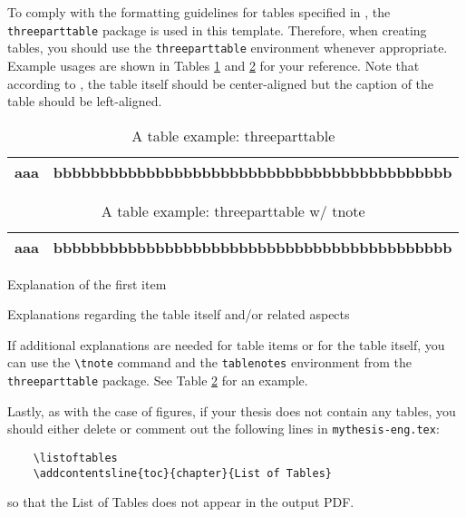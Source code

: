 To comply with the formatting guidelines for tables specified in \cite{ThesisGuide}, the \verb|threeparttable| package is used in this template.
Therefore, when creating tables, you should use the \verb|threeparttable| environment whenever appropriate.
Example usages are shown in Tables \ref{tab:Threeparttable} and \ref{tab:ThreeparttableWithTnote} for your reference.
Note that according to \cite{ThesisGuide}, the table itself should be center-aligned but the caption of the table should be left-aligned.

\begin{table}[ht]
	\centering%
	\begin{threeparttable}
		\caption{A table example: threeparttable}
		\begin{tabular}{>{\centering}m{1.5cm}|c}
			\hline\hline
			aaa 	& bbbbbbbbbbbbbbbbbbbbbbbbbbbbbbbbbbbbbbbbbbb \\
			\hline
		\end{tabular}	\label{tab:Threeparttable}
	\end{threeparttable}
\end{table}

\begin{table}[ht]
	\centering%
	\begin{threeparttable}
		\caption{A table example: threeparttable w/ tnote}
		\begin{tabular}{>{\centering}m{1.5cm}|c}
			\hline\hline
			aaa\tnote{1)} 	& bbbbbbbbbbbbbbbbbbbbbbbbbbbbbbbbbbbbbbbbbbb \\
			\hline
		\end{tabular}	\label{tab:ThreeparttableWithTnote}
		\begin{tablenotes}
			{\footnotesize
				\item[1)]	Explanation of the first item
				\item[2)]	Explanations regarding the table itself and/or related aspects
			}
		\end{tablenotes}
	\end{threeparttable}
\end{table}

If additional explanations are needed for table items or for the table itself, you can use the \verb|\tnote| command and the \verb|tablenotes| environment from the \verb|threeparttable| package.
See Table \ref{tab:ThreeparttableWithTnote} for an example.

Lastly, as with the case of figures, if your thesis does not contain any tables, you should either delete or comment out the following lines in \verb|mythesis-eng.tex|:
\begin{verbatim}
	\listoftables
	\addcontentsline{toc}{chapter}{List of Tables}
\end{verbatim}
so that the List of Tables does not appear in the output PDF.


